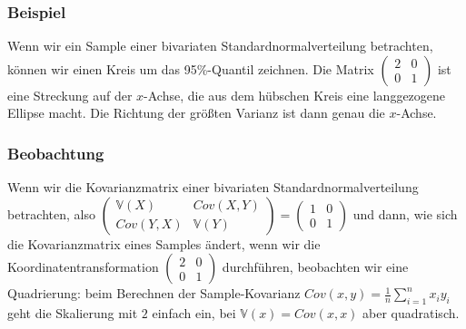 \begin{frame}
\frametitle{Beispiel}
Wenn wir ein Sample einer bivariaten Standardnormalverteilung betrachten, können wir einen Kreis um das 95\%-Quantil zeichnen.
Die Matrix $\begin{pmatrix} 2 & 0 \\ 0 & 1\end{pmatrix}$ ist eine Streckung auf der $x$-Achse, die aus dem hübschen Kreis eine langgezogene Ellipse macht.
Die Richtung der größten Varianz ist dann genau die $x$-Achse.

\end{frame}


\begin{frame}
\frametitle{Beobachtung}
Wenn wir die Kovarianzmatrix einer bivariaten Standardnormalverteilung betrachten, also $\begin{pmatrix} \mathbb{V}(X) & Cov(X,Y) \\ Cov(Y,X) & \mathbb{V}(Y) \end{pmatrix} = \begin{pmatrix} 1 & 0 \\ 0 & 1 \end{pmatrix}$
und dann, wie sich die Kovarianzmatrix eines Samples ändert, wenn wir die Koordinatentransformation $\begin{pmatrix} 2 & 0 \\ 0 & 1\end{pmatrix}$ durchführen,
beobachten wir eine Quadrierung: beim Berechnen der Sample-Kovarianz $Cov(x,y) = \frac{1}{n} \sum_{i=1}^n x_iy_i$ geht die Skalierung mit $2$ einfach ein, bei $\mathbb{V}(x) = Cov(x,x)$ aber quadratisch.

\end{frame}


